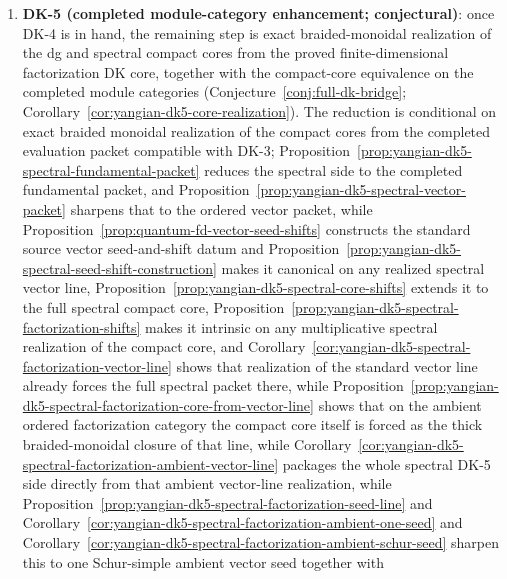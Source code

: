 \begin{enumerate}[label=\textup{(\roman*)}]
  For the standard type-$A$ RTT tower,
  Proposition~\ref{prop:yangian-dk4-typea-frontier}
  verifies the key identity $L_a(u)=R_{0a}(u-a)$ at finite stages.
  The formal moduli reformulation
  (Conjecture~\ref{conj:dk4-formal-moduli}) places DK-4 as the
  tangent Lie algebra of $\mathfrak{F}_{\cA}$.
\item \textbf{DK-5 \textup{(}completed module-category enhancement;
  conjectural\textup{)}}:
  once DK-4 is in hand, the remaining step is exact
  braided-monoidal realization of the dg and spectral compact cores
  from the proved finite-dimensional factorization DK core, together
  with the compact-core equivalence on the completed module categories
  \textup{(}Conjecture~\ref{conj:full-dk-bridge};
  Corollary~\ref{cor:yangian-dk5-core-realization}\textup{)}.
  The reduction is conditional on exact braided monoidal realization of
  the compact cores from the completed evaluation packet compatible
  with DK-3;
  Proposition~\ref{prop:yangian-dk5-spectral-fundamental-packet}
  reduces the spectral side to the completed fundamental packet, and
  Proposition~\ref{prop:yangian-dk5-spectral-vector-packet}
  sharpens that to the ordered vector packet, while
  Proposition~\ref{prop:quantum-fd-vector-seed-shifts} constructs the
  standard source vector seed-and-shift datum and
  Proposition~\ref{prop:yangian-dk5-spectral-seed-shift-construction}
  makes it canonical on any realized spectral vector line,
  Proposition~\ref{prop:yangian-dk5-spectral-core-shifts}
  extends it to the full spectral compact core,
  Proposition~\ref{prop:yangian-dk5-spectral-factorization-shifts}
  makes it intrinsic on any multiplicative spectral realization of the
  compact core, and
  Corollary~\ref{cor:yangian-dk5-spectral-factorization-vector-line}
  shows that realization of the standard vector line already forces
  the full spectral packet there,
  while
  Proposition~\ref{prop:yangian-dk5-spectral-factorization-core-from-vector-line}
  shows that on the ambient ordered factorization category the compact
  core itself is forced as the thick braided-monoidal closure of that
  line,
  while
  Corollary~\ref{cor:yangian-dk5-spectral-factorization-ambient-vector-line}
  packages the whole spectral DK-5 side directly from that ambient
  vector-line realization,
  while
  Proposition~\ref{prop:yangian-dk5-spectral-factorization-seed-line}
  and
  Corollary~\ref{cor:yangian-dk5-spectral-factorization-ambient-one-seed}
  and
  Corollary~\ref{cor:yangian-dk5-spectral-factorization-ambient-schur-seed}
  sharpen this to one Schur-simple ambient vector seed together with

\end{enumerate}

